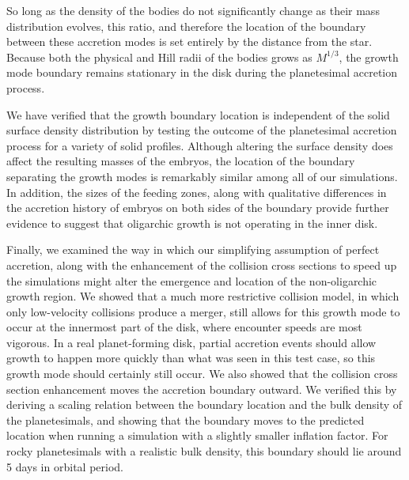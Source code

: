 \documentclass[twocolumn,linenumbers]{aastex63}
\begin{document}
So long as the density of the bodies do not significantly change as
their mass distribution evolves, this ratio, and therefore the
location of the boundary between these accretion modes is set entirely by the distance
from the star. Because both the physical and Hill radii of the bodies
grows as $M^{1/3}$, the growth mode boundary remains stationary
 in the disk during the planetesimal accretion process.
 
We have verified that the growth boundary location is independent of the
solid surface density distribution by testing the outcome of the planetesimal
accretion process for a variety of solid
profiles. Although altering the surface density does affect the
resulting masses of the embryos, the location of the boundary
separating the growth modes is remarkably similar among all of our simulations.
In addition, the sizes of the feeding zones, along with qualitative differences in the
accretion history of embryos on both sides of the boundary provide further evidence to
suggest that oligarchic growth is not operating in the inner disk.

Finally, we examined the way in which our simplifying assumption of perfect accretion, along with the enhancement of the 
collision cross sections to speed up the simulations might alter the emergence and location of the non-oligarchic growth region. 
We showed that a much more restrictive collision model, in which only low-velocity collisions produce a merger, still allows for 
this growth mode to occur at the innermost part of the disk, where encounter speeds are most vigorous. In a real planet-forming 
disk, partial accretion events should allow growth to happen more quickly than what was seen in this test case, so this growth 
mode should certainly still occur. We also showed that the collision cross section enhancement moves the accretion boundary 
outward. We verified this by deriving a scaling relation between the boundary location and the bulk density of the planetesimals, 
and showing that the boundary moves to the predicted location when running a simulation with a slightly smaller inflation factor. 
For rocky planetesimals with a realistic bulk density, this boundary should lie around 5 days in orbital period.
\end{document}
